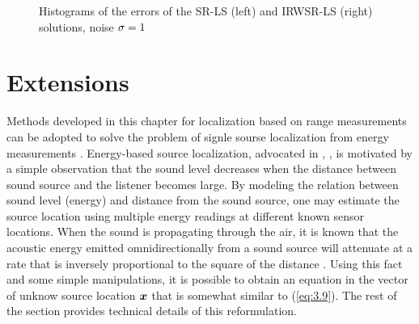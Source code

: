 \begin{figure}%
\centering
\caption{Histograms of the errors of the SR-LS (left) and IRWSR-LS (right) solutions, noise $\protect\sigma = 1$}
\label{fig:Noise00IRDW}
\end{figure}



\newpage
\section{Extensions}


Methods developed in this chapter for localization based on range measurements can be adopted to solve the problem of signle sourse localization from energy measurements \cite{StLi}. 
Energy-based source localization, advocated in \cite{LiHu}, \cite{Saric}, is motivated by a simple observation that the sound level decreases when the distance between sound source and the listener becomes large. By modeling the relation between sound level (energy) and distance from the sound source, one may estimate the source location using multiple energy readings at different known sensor locations. When the sound is propagating through the air, it is known that the acoustic energy emitted omnidirectionally from a sound source will attenuate at a rate that is inversely proportional to the square of the distance \cite{LiHu}. Using this fact and some simple manipulations, it is possible to obtain an equation in the vector of unknow source location $\mbox{\boldmath$x$}$ that is somewhat similar to (\ref{eq:3.9}). The rest of the section provides technical details of this reformulation. 

